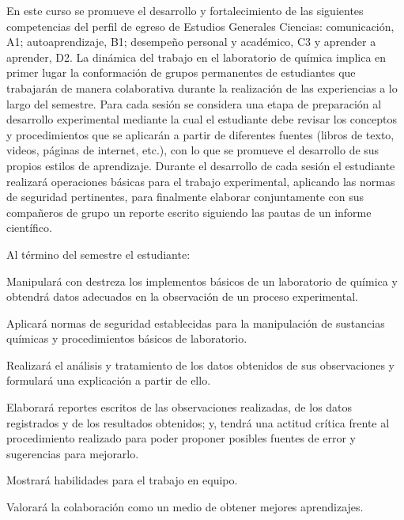 \begin{syllabus}


\begin{justification}
En este curso se promueve el desarrollo y fortalecimiento de las siguientes competencias del perfil de egreso de Estudios Generales Ciencias: comunicación, A1; autoaprendizaje, B1; desempeño personal y académico, C3 y aprender a aprender, D2. La dinámica del trabajo en el laboratorio de química implica en primer lugar la conformación de grupos permanentes de estudiantes que trabajarán de manera colaborativa durante la realización de las experiencias a lo largo del semestre. Para cada sesión se considera una etapa de preparación al desarrollo experimental mediante la cual el estudiante debe revisar los conceptos y procedimientos que se aplicarán a partir de diferentes fuentes (libros de texto, videos, páginas de internet, etc.), con lo que se promueve el desarrollo de sus propios estilos de aprendizaje. Durante el desarrollo de cada sesión el estudiante realizará operaciones básicas para el trabajo experimental, aplicando las normas de seguridad pertinentes, para finalmente elaborar conjuntamente con sus compañeros de grupo un reporte escrito siguiendo las pautas de un informe científico.

Al término del semestre el estudiante:
\end{justification}

\begin{goals}


\item Manipulará con destreza los implementos básicos de un laboratorio de química y obtendrá datos adecuados en la observación de un proceso experimental. 
\item Aplicará normas de seguridad establecidas para la manipulación de sustancias químicas y procedimientos básicos de laboratorio.
\item Realizará el análisis y tratamiento de los datos obtenidos de sus observaciones y formulará una explicación a partir de ello.
\item Elaborará reportes escritos de las observaciones realizadas, de los datos registrados y de los resultados obtenidos; y, tendrá una actitud crítica frente al procedimiento realizado para poder proponer posibles fuentes de error y sugerencias para mejorarlo. 
\item Mostrará habilidades para el trabajo en equipo.
\item Valorará la colaboración como un medio de obtener mejores aprendizajes.
\end{goals}


\end{syllabus}
